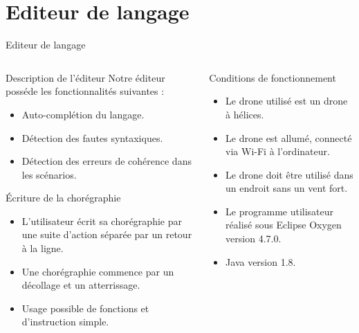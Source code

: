 \documentclass{bredelebeamer}
\begin{document}
\section{Editeur de langage}

\begin{frame}{Editeur de langage}
\begin{columns}
\begin{column}{0.5\textwidth}
\begin{block}{Description de l'éditeur}
Notre éditeur posséde les fonctionnalités suivantes :
\begin{itemize}
\item Auto-complétion du langage. 
\item Détection des fautes syntaxiques.
\item Détection des erreurs de cohérence dans les scénarios.
\end{itemize}
\end{block}\pause


\begin{block}{Écriture de la chorégraphie}
\begin{itemize}
\item L'utilisateur écrit sa chorégraphie par une suite d'action séparée par un retour à la ligne.
\item Une chorégraphie commence par un décollage et un atterrissage.
\item Usage possible de fonctions et d'instruction simple.
\end{itemize}
\end{block}\pause
\end{column}
\begin{column}{0.5\textwidth}
\begin{alertblock}{Conditions de fonctionnement}
\begin{itemize}
\item Le drone utilisé est un drone à hélices. 
\item Le drone est allumé, connecté via Wi-Fi à l’ordinateur.
\item Le drone doit être utilisé dans un endroit sans un vent fort.
\item Le programme utilisateur réalisé sous Eclipse Oxygen version 4.7.0.
\item Java version 1.8. 
\end{itemize}
\end{alertblock}
\vspace{80px}
\end{column}
\end{columns}
\end{frame}
\end{document}
